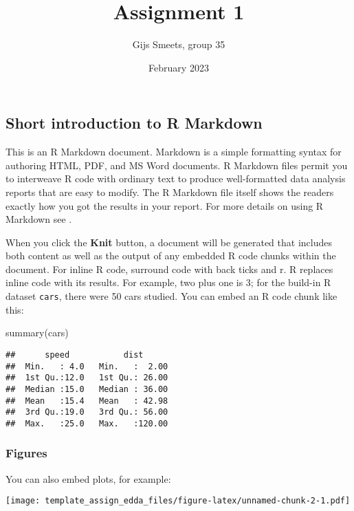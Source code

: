 \documentclass[
  11pt,
]{article}
\title{Assignment 1}
\author{Gijs Smeets, group 35}
\date{February 2023}
\newenvironment{Shaded}{\begin{snugshade}}{\end{snugshade}}
\newcommand{\FunctionTok}[1]{\textcolor[rgb]{0.00,0.00,0.00}{#1}}
\newcommand{\NormalTok}[1]{#1}
\begin{document}
\maketitle

\hypertarget{short-introduction-to-r-markdown}{%
\subsection{Short introduction to R
Markdown}\label{short-introduction-to-r-markdown}}

This is an R Markdown document. Markdown is a simple formatting syntax
for authoring HTML, PDF, and MS Word documents. R Markdown files permit
you to interweave R code with ordinary text to produce well-formatted
data analysis reports that are easy to modify. The R Markdown file
itself shows the readers exactly how you got the results in your report.
For more details on using R Markdown see
\href{http://rmarkdown.rstudio.com}{}.

When you click the \textbf{Knit} button, a document will be generated
that includes both content as well as the output of any embedded R code
chunks within the document. For inline R code, surround code with back
ticks and r. R replaces inline code with its results. For example, two
plus one is 3; for the build-in R dataset \texttt{cars}, there were 50
cars studied. You can embed an R code chunk like this:

\begin{Shaded}
\begin{Highlighting}[]
\FunctionTok{summary}\NormalTok{(cars)}
\end{Highlighting}
\end{Shaded}

\begin{verbatim}
##      speed           dist       
##  Min.   : 4.0   Min.   :  2.00  
##  1st Qu.:12.0   1st Qu.: 26.00  
##  Median :15.0   Median : 36.00  
##  Mean   :15.4   Mean   : 42.98  
##  3rd Qu.:19.0   3rd Qu.: 56.00  
##  Max.   :25.0   Max.   :120.00
\end{verbatim}

\hypertarget{figures}{%
\subsubsection{Figures}\label{figures}}

You can also embed plots, for example:

\texttt{[image: template\_assign\_edda\_files/figure-latex/unnamed-chunk-2-1.pdf]}
\end{document}
